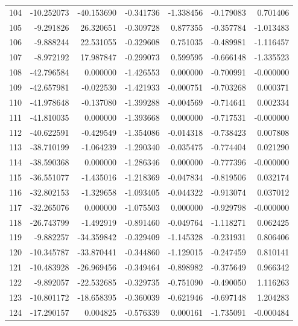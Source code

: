 \begin{tabular}{rrrrrrr}
104 & -10.252073 &  -40.153690 & -0.341736 &   -1.338456 &   -0.179083 &  0.701406 \\
105 &  -9.291826 &   26.320651 & -0.309728 &    0.877355 &   -0.357784 & -1.013483 \\
106 &  -9.888244 &   22.531055 & -0.329608 &    0.751035 &   -0.489981 & -1.116457 \\
107 &  -8.972192 &   17.987847 & -0.299073 &    0.599595 &   -0.666148 & -1.335523 \\
108 & -42.796584 &    0.000000 & -1.426553 &    0.000000 &   -0.700991 & -0.000000 \\
109 & -42.657981 &   -0.022530 & -1.421933 &   -0.000751 &   -0.703268 &  0.000371 \\
110 & -41.978648 &   -0.137080 & -1.399288 &   -0.004569 &   -0.714641 &  0.002334 \\
111 & -41.810035 &    0.000000 & -1.393668 &    0.000000 &   -0.717531 & -0.000000 \\
112 & -40.622591 &   -0.429549 & -1.354086 &   -0.014318 &   -0.738423 &  0.007808 \\
113 & -38.710199 &   -1.064239 & -1.290340 &   -0.035475 &   -0.774404 &  0.021290 \\
114 & -38.590368 &    0.000000 & -1.286346 &    0.000000 &   -0.777396 & -0.000000 \\
115 & -36.551077 &   -1.435016 & -1.218369 &   -0.047834 &   -0.819506 &  0.032174 \\
116 & -32.802153 &   -1.329658 & -1.093405 &   -0.044322 &   -0.913074 &  0.037012 \\
117 & -32.265076 &    0.000000 & -1.075503 &    0.000000 &   -0.929798 & -0.000000 \\
118 & -26.743799 &   -1.492919 & -0.891460 &   -0.049764 &   -1.118271 &  0.062425 \\
119 &  -9.882257 &  -34.359842 & -0.329409 &   -1.145328 &   -0.231931 &  0.806406 \\
120 & -10.345787 &  -33.870441 & -0.344860 &   -1.129015 &   -0.247459 &  0.810141 \\
121 & -10.483928 &  -26.969456 & -0.349464 &   -0.898982 &   -0.375649 &  0.966342 \\
122 &  -9.892057 &  -22.532685 & -0.329735 &   -0.751090 &   -0.490050 &  1.116263 \\
123 & -10.801172 &  -18.658395 & -0.360039 &   -0.621946 &   -0.697148 &  1.204283 \\
124 & -17.290157 &    0.004825 & -0.576339 &    0.000161 &   -1.735091 & -0.000484 \\

\end{tabular}
